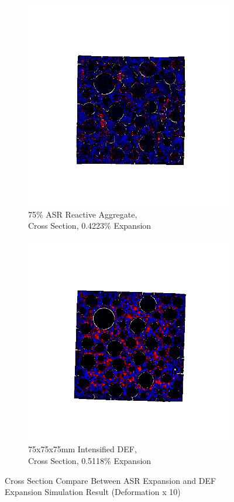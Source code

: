 \begin{figure}[ht]
\centering

    \begin{subfigure}{.5\textwidth}
      \centering
      \includegraphics[width=.5\linewidth]{Files/exp_3D/ASR/A30P75_3_stress.png}
      \caption{75\% ASR Reactive Aggregate, \\ Cross Section, 0.4223\% Expansion}
    \end{subfigure}%
    \begin{subfigure}{.5\textwidth}
      \centering
      \includegraphics[width=.5\linewidth]{Files/exp_3D/DEF/A30X-5C_3_stress.png}
      \caption{75x75x75mm Intensified DEF, \\ Cross Section, 0.5118\% Expansion}
    \end{subfigure}

    

  \caption{Cross Section Compare Between ASR Expansion and DEF Expansion Simulation Result (Deformation x 10)}
  \label{fig:ASRvsDEF_IS}
\end{figure}

